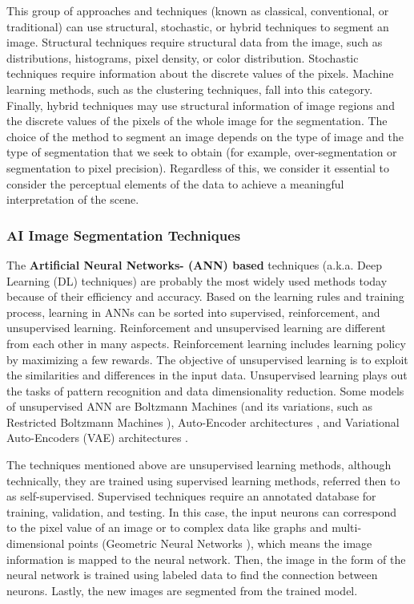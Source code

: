 This group of approaches and techniques (known as classical, conventional, or traditional) can use structural, stochastic, or hybrid techniques to segment an image. Structural techniques require structural data from the image, such as distributions, histograms, pixel density, or color distribution. Stochastic techniques require information about the discrete values of the pixels. Machine learning methods, such as the clustering techniques, fall into this category. Finally, hybrid techniques may use structural information of image regions and the discrete values of the pixels of the whole image for the segmentation. The choice of the method to segment an image depends on the type of image and the type of segmentation that we seek to obtain (for example, over-segmentation or segmentation to pixel precision). Regardless of this, we consider it essential to consider the perceptual elements of the data to achieve a meaningful interpretation of the scene.

\subsubsection*{AI Image Segmentation Techniques} 
The \textbf{Artificial Neural Networks- (ANN) based} techniques (a.k.a. Deep Learning (DL) techniques) are probably the most widely used methods today because of their efficiency and accuracy. Based on the learning rules and training process, learning in ANNs can be sorted into supervised, reinforcement, and unsupervised learning. Reinforcement and unsupervised learning are different from each other in many aspects. Reinforcement learning includes learning policy by maximizing a few rewards. The objective of unsupervised learning is to exploit the similarities and differences in the input data. Unsupervised learning plays out the tasks of pattern recognition and data dimensionality reduction. Some models of unsupervised ANN are Boltzmann Machines \citep{Salakhutdinov.Hinton:AIS:2009} (and its variations, such as Restricted Boltzmann Machines \citep{Fischer.Igel:Book:2012}), Auto-Encoder architectures \citep{Makhzani.Shlens.ea:arXiv:2016}, and Variational Auto-Encoders (VAE) architectures \citep{Doersch:arXiv:2021}.

The techniques mentioned above are unsupervised learning methods, although technically, they are trained using supervised learning methods, referred then to as self-supervised. Supervised techniques require an annotated database for training, validation, and testing. In this case, the input neurons can correspond to the pixel value of an image or to complex data like graphs and multi-dimensional points (Geometric Neural Networks \citep{Bronstein.Bruna.ea:SPM:2017}), which means the image information is mapped to the neural network. Then, the image in the form of the neural network is trained using labeled data to find the connection between neurons. Lastly, the new images are segmented from the trained model. 


